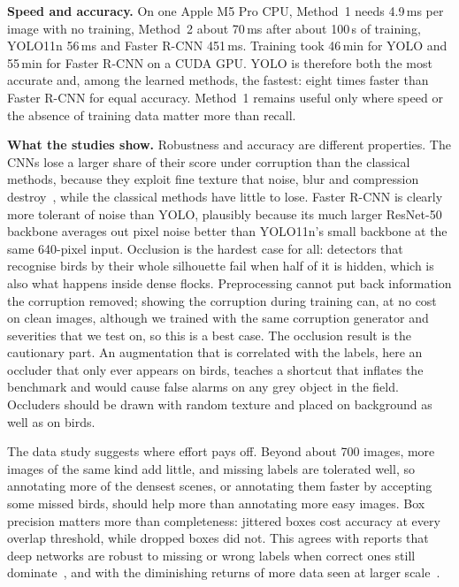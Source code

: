 \textbf{Speed and accuracy.} On one Apple M5 Pro CPU, Method~1 needs 4.9\,ms per image with no
training, Method~2 about 70\,ms after about 100\,s of training, YOLO11n 56\,ms and Faster R-CNN
451\,ms. Training took 46\,min for YOLO and 55\,min for Faster R-CNN on a CUDA GPU. YOLO is
therefore both the most accurate and, among the learned methods, the fastest: eight times
faster than Faster R-CNN for equal accuracy. Method~1 remains useful only where speed or the
absence of training data matter more than recall.

\textbf{What the studies show.} Robustness and accuracy are different properties. The CNNs lose
a larger share of their score under corruption than the classical methods, because they exploit
fine texture that noise, blur and compression destroy~\cite{dodge2016understanding}, while the classical methods have little
to lose. Faster R-CNN is clearly more tolerant of noise than YOLO, plausibly because its much
larger ResNet-50 backbone averages out pixel noise better than YOLO11n's small backbone at the
same 640-pixel input. Occlusion is the hardest case for all: detectors that recognise birds by
their whole silhouette fail when half of it is hidden, which is also what happens inside dense
flocks. Preprocessing cannot put back information the corruption removed; showing the
corruption during training can, at no cost on clean images, although we trained with the same
corruption generator and severities that we test on, so this is a best case. The occlusion result is the
cautionary part. An augmentation that is correlated with the labels, here an occluder that only
ever appears on birds, teaches a shortcut that inflates the benchmark and would cause false
alarms on any grey object in the field. Occluders should be drawn with random texture and
placed on background as well as on birds.

The data study suggests where effort pays off. Beyond about 700 images, more images of the
same kind add little, and missing labels are tolerated well, so annotating more of the
densest scenes, or annotating them faster by accepting some missed birds, should help more than
annotating more easy images. Box precision matters more than completeness: jittered boxes
cost accuracy at every overlap threshold, while dropped boxes did not. This agrees with
reports that deep networks are robust to missing or wrong labels when correct ones still
dominate~\cite{rolnick2017deep,frenay2014classification}, and with the diminishing returns
of more data seen at larger scale~\cite{sun2017revisiting}.

